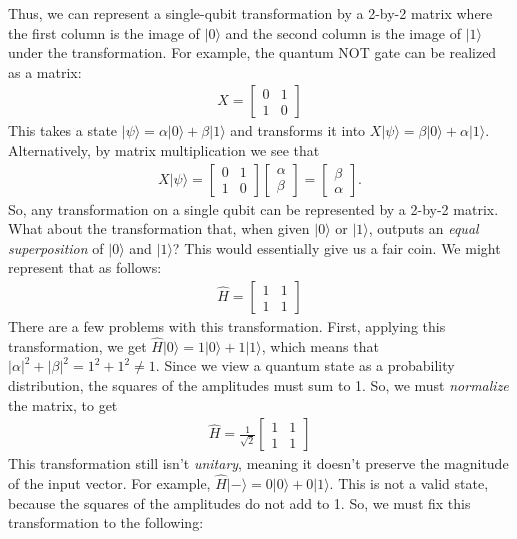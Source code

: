 \documentclass[12pt,twoside]{reedthesis}
\theoremstyle{definition}
\newcommand{\ketz}{\ensuremath{\lvert 0\rangle}\xspace}
\newcommand{\keto}{\ensuremath{\lvert 1\rangle}\xspace}
\newcommand{\ketpsi}{\ensuremath{|\psi\rangle}\xspace}
\newcommand{\Hminus}{\ensuremath{\lvert- \rangle}\xspace}
\begin{document}
Thus, we can represent a single-qubit transformation by a 2-by-2 matrix where the first column is the image of \ketz and the second column is the image of \keto under the transformation. For example, the quantum NOT gate can be realized as a matrix:
\begin{align*}
X = \begin{bmatrix}
0 & 1\\
1 & 0 
\end{bmatrix}
\end{align*}
This takes a state $\ketpsi = \alpha \ketz + \beta \keto$ and transforms it into $X \ketpsi  = \beta \ketz + \alpha \keto$. Alternatively, by matrix multiplication we see that
\begin{align*}
X \ketpsi = \begin{bmatrix}
0 & 1\\
1 & 0 
\end{bmatrix}
\begin{bmatrix}
\alpha \\
\beta
\end{bmatrix} 
= 
\begin{bmatrix}
\beta \\
\alpha
\end{bmatrix}.
\end{align*}
So, any transformation on a single qubit can be represented by a 2-by-2 matrix. What about the transformation that, when given \ketz or \keto, outputs an \textit{equal superposition} of \ketz and \keto ? This would essentially give us a fair coin. We might represent that as follows:
\begin{align*}
\widehat{H} = \begin{bmatrix}
1 & 1\\
1 & 1 
\end{bmatrix}
\end{align*}
There are a few problems with this transformation. First, applying this transformation, we get $\widehat{H} \ketz = 1\ketz + 1\keto$, which means that $\lvert \alpha \rvert ^2+ \lvert \beta \rvert ^2= 1^2 + 1^2 \neq 1.$ Since we view a quantum state as a probability distribution, the squares of the amplitudes must sum to 1. So, we must \textit{normalize} the matrix, to get 
\begin{align*}
\widehat{H} = 
\frac{1}{\sqrt{2}}
\begin{bmatrix}
1 & 1\\
1 & 1 
\end{bmatrix}
\end{align*}
This transformation still isn't \textit{unitary}, meaning it doesn't preserve the magnitude of the input vector. For example, $\widehat{H} \Hminus = 0\ketz + 0 \keto$. This is not a valid state, because the squares of the amplitudes do not add to 1. So, we must fix this transformation to the following:
\end{document}
